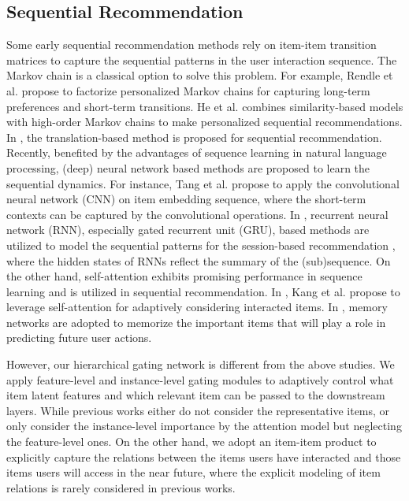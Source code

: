 \documentclass[sigconf]{acmart}
\begin{document}
\subsection{Sequential Recommendation}
Some early sequential recommendation methods rely on item-item transition matrices to capture the sequential patterns in the user interaction sequence. The Markov chain \cite{DBLP:conf/ijcai/ChengYLK13} is a classical option to solve this problem. For example, Rendle et al. \cite{DBLP:conf/www/RendleFS10} propose to factorize personalized Markov chains for capturing long-term preferences and short-term transitions. He et al. \cite{DBLP:conf/icdm/HeM16} combines similarity-based models with high-order Markov chains to make personalized sequential recommendations. In \cite{DBLP:conf/recsys/HeKM17}, the translation-based method is proposed for sequential recommendation. Recently, benefited by the advantages of sequence learning in natural language processing, (deep) neural network based methods are proposed to learn the sequential dynamics. For instance, Tang et al. \cite{DBLP:conf/wsdm/TangW18} propose to apply the convolutional neural network (CNN) on item embedding sequence, where the short-term contexts can be captured by the convolutional operations. In \cite{DBLP:journals/corr/HidasiKBT15,DBLP:conf/recsys/QuadranaKHC17,DBLP:conf/cikm/LiRCRLM17,DBLP:conf/cikm/HidasiK18}, recurrent neural network (RNN), especially gated recurrent unit (GRU), based methods are utilized to model the sequential patterns  for the session-based recommendation \cite{DBLP:journals/corr/HidasiKBT15}, where the hidden states of RNNs reflect the summary of the (sub)sequence. On the other hand, self-attention \cite{DBLP:conf/nips/VaswaniSPUJGKP17} exhibits promising performance in sequence learning and is utilized in sequential recommendation. In \cite{DBLP:conf/icdm/KangM18}, Kang et al. propose to leverage self-attention for adaptively considering interacted items. In \cite{DBLP:conf/wsdm/ChenXZT0QZ18,DBLP:conf/sigir/HuangZDWC18}, memory networks \cite{DBLP:conf/nips/SukhbaatarSWF15} are adopted to memorize the important items that will play a role in predicting future user actions.

However, our hierarchical gating network is different from the above studies. We apply feature-level and instance-level gating modules to adaptively control what item latent features and which relevant item can be passed to the downstream layers. While previous works either do not consider the representative items, or only consider the instance-level importance by the attention model but neglecting the feature-level ones. On the other hand, we adopt an item-item product to explicitly capture the relations between the items users have interacted and those items users will access in the near future, where the explicit modeling of item relations is rarely considered in previous works.
 
\end{document}
